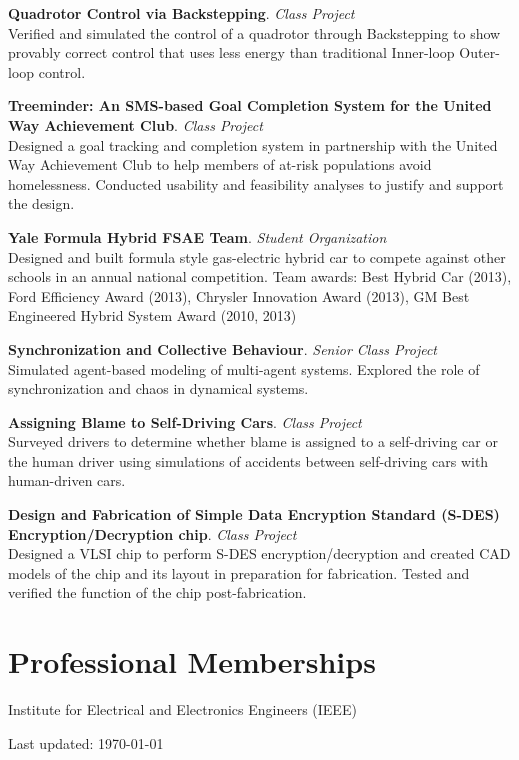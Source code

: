 \documentclass[letterpaper]{article}
\def\footerlink{}
\renewenvironment{itemize}{
  \begin{list}{}{
    \setlength{\leftmargin}{1.5em}
  }
}{
  \end{list}
}
\begin{document}
\begin{description}[leftmargin=7.5em, style=nextline]
  \item[Spring 2016] \textbf{Quadrotor Control via Backstepping}. \textit{Class Project} \\
  Verified and simulated the control of a quadrotor through Backstepping to show provably correct control that uses less energy than traditional Inner-loop Outer-loop control.

  \item[Spring 2016] \textbf{Treeminder: An SMS-based Goal Completion System for the United Way Achievement Club}. \textit{Class Project} \\
  Designed a goal tracking and completion system in partnership with the United Way Achievement Club to help members of at-risk populations avoid homelessness. Conducted usability and feasibility analyses to justify and support the design.

  \item[2009 --- 2013] \textbf{Yale Formula Hybrid FSAE Team}. \textit{Student Organization} \\
  Designed and built formula style gas-electric hybrid car to compete against other schools in an annual national competition. Team awards: Best Hybrid Car (2013), Ford Efficiency Award (2013), Chrysler Innovation Award (2013), GM Best Engineered Hybrid System Award (2010, 2013)

  \item[2012 --- 2013] \textbf{Synchronization and Collective Behaviour}. \textit{Senior Class Project} \\
  Simulated agent-based modeling of multi-agent systems. Explored the role of synchronization and chaos in dynamical systems.

  \item[Spring 2012] \textbf{Assigning Blame to Self-Driving Cars}. \textit{Class Project} \\
  Surveyed drivers to determine whether blame is assigned to a self-driving car or the human driver using simulations of accidents between self-driving cars with human-driven cars.

  \item[Fall 2011] \textbf{Design and Fabrication of Simple Data Encryption Standard (S-DES) Encryption/Decryption chip}. \textit{Class Project} \\
  Designed a VLSI chip to perform S-DES encryption/decryption and created CAD models of the chip and its layout in preparation for fabrication. Tested and verified the function of the chip post-fabrication.
\end{description}

\section*{Professional Memberships}

\begin{itemize}
  \item Institute for Electrical and Electronics Engineers (IEEE)
\end{itemize}

\bigskip

\begin{center}
  \begin{footnotesize}
    Last updated: \today \\
    \href{\footerlink}{\texttt{\footerlink}}
  \end{footnotesize}
\end{center}
\end{document}
